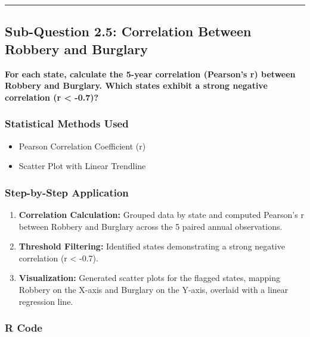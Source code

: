 \documentclass[
]{article}
\providecommand{\tightlist}{%
  \setlength{\itemsep}{0pt}\setlength{\parskip}{0pt}}
\begin{document}
\begin{center}\rule{0.5\linewidth}{0.5pt}\end{center}

\subsection{Sub-Question 2.5: Correlation Between Robbery and
Burglary}\label{sub-question-2.5-correlation-between-robbery-and-burglary}

\textbf{For each state, calculate the 5-year correlation (Pearson's r)
between Robbery and Burglary. Which states exhibit a strong negative
correlation (r \textless{} -0.7)?}

\subsubsection{Statistical Methods
Used}\label{statistical-methods-used-4}

\begin{itemize}
\tightlist
\item
  Pearson Correlation Coefficient (r)
\item
  Scatter Plot with Linear Trendline
\end{itemize}

\subsubsection{Step-by-Step
Application}\label{step-by-step-application-4}

\begin{enumerate}
\def\labelenumi{\arabic{enumi}.}
\tightlist
\item
  \textbf{Correlation Calculation:} Grouped data by state and computed
  Pearson's r between Robbery and Burglary across the 5 paired annual
  observations.
\item
  \textbf{Threshold Filtering:} Identified states demonstrating a strong
  negative correlation (r \textless{} -0.7).
\item
  \textbf{Visualization:} Generated scatter plots for the flagged
  states, mapping Robbery on the X-axis and Burglary on the Y-axis,
  overlaid with a linear regression line.
\end{enumerate}

\subsubsection{R Code}\label{r-code-4}
\end{document}

